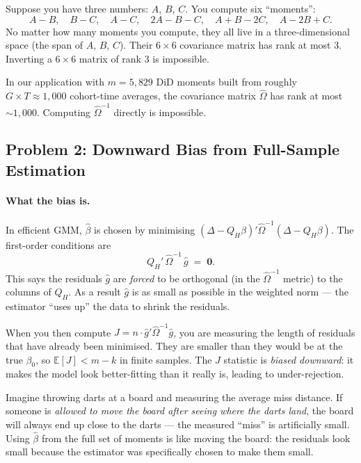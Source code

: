 \medskip
\begin{tcolorbox}[colback=gray!8, colframe=gray!40, title=Simple analogy]
Suppose you have three numbers: $A$, $B$, $C$.
You compute six ``moments'':
\[
  A-B,\quad B-C,\quad A-C,\quad 2A-B-C,\quad A+B-2C,\quad A-2B+C.
\]
No matter how many moments you compute, they all live in a
three-dimensional space (the span of $A$, $B$, $C$).
Their $6\times6$ covariance matrix has rank at most 3.
Inverting a $6\times6$ matrix of rank 3 is impossible.
\end{tcolorbox}
\medskip

In our application with $m = 5{,}829$ DiD moments built from roughly
$G\times T \approx 1{,}000$ cohort-time averages, the covariance matrix
$\hat\Omega$ has rank at most ${\sim}1{,}000$.  Computing
$\hat\Omega^{-1}$ directly is impossible.

\subsection{Problem 2: Downward Bias from Full-Sample Estimation}
\label{subsec:downward_bias}

\paragraph{What the bias is.}
In efficient GMM, $\hat\beta$ is chosen by minimising
$(\Delta - Q_H\beta)'\hat\Omega^{-1}(\Delta - Q_H\beta)$.
The first-order conditions are
\begin{equation}
  Q_H'\,\hat\Omega^{-1}\,\hat g \;=\; \mathbf{0}.
  \label{eq:foc}
\end{equation}
This says the residuals $\hat g$ are \emph{forced} to be orthogonal
(in the $\hat\Omega^{-1}$ metric) to the columns of $Q_H$.
As a result $\hat g$ is as small as possible in the weighted norm ---
the estimator ``uses up'' the data to shrink the residuals.

When you then compute $J = n\cdot\hat g'\hat\Omega^{-1}\hat g$, you are
measuring the length of residuals that have already been minimised.
They are smaller than they would be at the true $\beta_0$, so
$\mathbb{E}[J] < m - k$ in finite samples.  The $J$ statistic is
\emph{biased downward}: it makes the model look better-fitting than it
really is, leading to under-rejection.

\medskip
\begin{tcolorbox}[colback=gray!8, colframe=gray!40,
  title=Simple analogy]
Imagine throwing darts at a board and measuring the average miss
distance.  If someone is \emph{allowed to move the board after seeing
where the darts land}, the board will always end up close to the darts
--- the measured ``miss'' is artificially small.  Using $\hat\beta$ from
the full set of moments is like moving the board: the residuals look
small because the estimator was specifically chosen to make them small.
\end{tcolorbox}

